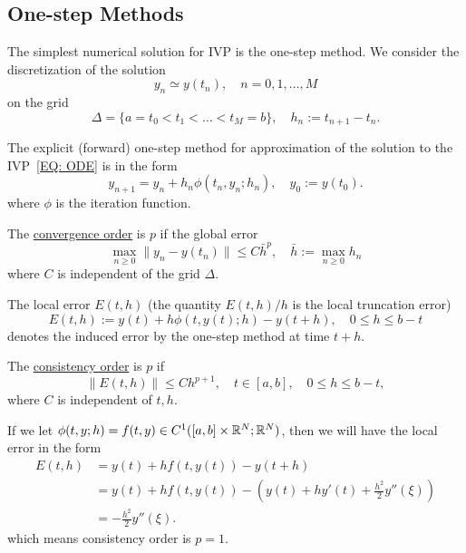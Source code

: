 \subsection{One-step Methods}
The simplest numerical solution for IVP is the one-step method. We consider the discretization of the solution 
$$y_n\simeq y(t_n), \quad n = 0,1,\dots, M$$
on the grid 
$$\Delta = \{ a=  t_0 < t_1 < \dots < t_M  = b\},\quad h_n := t_{n+1} - t_n.$$
\begin{definition}[scheme]
    The explicit (forward) one-step method for approximation of the solution to the IVP~\eqref{EQ: ODE} is in the form
    \begin{equation}
        y_{n+1} = y_n + h_n \phi(t_n, y_n; h_n),\quad y_0:= y(t_0).
    \end{equation}
where $\phi$ is the iteration function.
\end{definition}
\begin{definition}[convergence]
    The \underline{convergence order} is $p$ if the global error 
    \begin{equation}
        \max_{n\ge 0}\|y_n - y(t_n)\| \le C \bar{h}^p,\quad \bar{h}:=\max_{n\ge 0}  h_n
    \end{equation} 
    where $C$ is independent of the grid $\Delta$.
\end{definition}
\begin{definition}
The local error $E(t, h)$ (the quantity $E(t, h)/h$ is the local truncation error)
\begin{equation}
    E(t, h) := y(t) + h \phi(t, y(t); h) - y(t + h),\quad 0\le h\le b - t
\end{equation}
denotes the induced error by the one-step method at time $t+ h$.
\end{definition}
\begin{definition}[consistency]
    The \underline{consistency order} is $p$ if 
    \begin{equation}
        \|E(t, h)\|\le C h^{p+1},\quad t\in[a, b],\quad 0\le h \le b - t,
    \end{equation}
    where $C$ is independent of $t, h$.
\end{definition}
\begin{example}
    If we let $\phi(t, y; h) = f(t, y)\in C^1([a, b]\times \mathbb R^N; \mathbb R^N)$, then we will have the local error in the form 
    \begin{equation}
        \begin{aligned}
            E(t, h) &= y(t) + h f(t, y(t)) - y(t + h) \\    
            &= y(t) + h f(t, y(t)) - (y(t) + h y'(t) + \frac{h^2}{2} y''(\xi)) \\
            & = -\frac{h^2}{2} y''(\xi).
        \end{aligned} 
    \end{equation}
    which means consistency order is $p = 1$.
\end{example}
